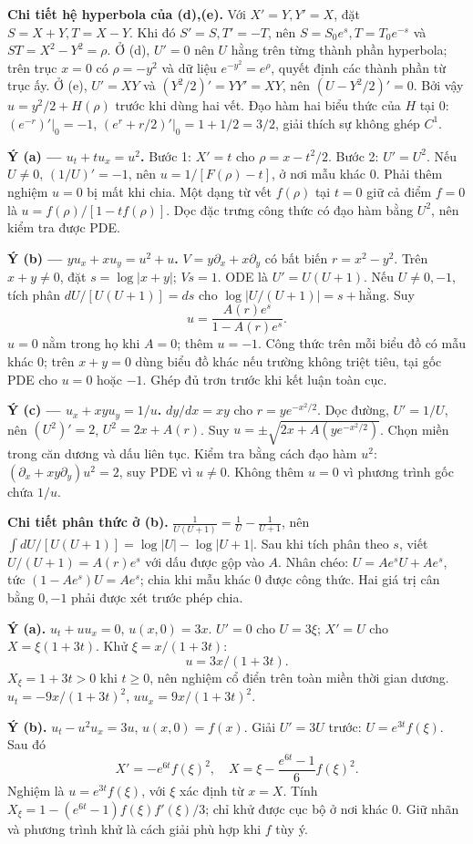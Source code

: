 \textbf{Chi tiết hệ hyperbola của (d),(e).} Với $X'=Y,Y'=X$, đặt $S=X+Y,T=X-Y$. Khi đó $S'=S,T'=-T$, nên $S=S_0e^s,T=T_0e^{-s}$ và $ST=X^2-Y^2=\rho$. Ở (d), $U'=0$ nên $U$ hằng trên từng thành phần hyperbola; trên trục $x=0$ có $\rho=-y^2$ và dữ liệu $e^{-y^2}=e^\rho$, quyết định các thành phần từ trục ấy. Ở (e), $U'=XY$ và $(Y^2/2)'=YY'=XY$, nên $(U-Y^2/2)'=0$. Bởi vậy $u=y^2/2+H(\rho)$ trước khi dùng hai vết. Đạo hàm hai biểu thức của $H$ tại $0$: $(e^{-r})'|_0=-1$, $(e^r+r/2)'|_0=1+1/2=3/2$, giải thích sự không ghép $C^1$.

\textbf{Ý (a) — $u_t+tu_x=u^2$.} Bước 1: $X'=t$ cho $\rho=x-t^2/2$. Bước 2: $U'=U^2$. Nếu $U\ne0$, $(1/U)'=-1$, nên $u=1/[F(\rho)-t]$, ở nơi mẫu khác 0. Phải thêm nghiệm $u=0$ bị mất khi chia. Một dạng từ vết $f(\rho)$ tại $t=0$ giữ cả điểm $f=0$ là $u=f(\rho)/[1-tf(\rho)]$. Dọc đặc trưng công thức có đạo hàm bằng $U^2$, nên kiểm tra được PDE.

\textbf{Ý (b) — $yu_x+xu_y=u^2+u$.} $V=y\partial_x+x\partial_y$ có bất biến $r=x^2-y^2$. Trên $x+y\ne0$, đặt $s=\log|x+y|$; $Vs=1$. ODE là $U'=U(U+1)$. Nếu $U\ne0,-1$, tích phân $dU/[U(U+1)]=ds$ cho $\log|U/(U+1)|=s+\text{hằng}$. Suy
\[u=\frac{A(r)e^s}{1-A(r)e^s}.\]
$u=0$ nằm trong họ khi $A=0$; thêm $u=-1$. Công thức trên mỗi biểu đồ có mẫu khác 0; trên $x+y=0$ dùng biểu đồ khác nếu trường không triệt tiêu, tại gốc PDE cho $u=0$ hoặc $-1$. Ghép đủ trơn trước khi kết luận toàn cục.

\textbf{Ý (c) — $u_x+xyu_y=1/u$.} $dy/dx=xy$ cho $r=ye^{-x^2/2}$. Dọc đường, $U'=1/U$, nên $(U^2)'=2$, $U^2=2x+A(r)$. Suy $u=\pm\sqrt{2x+A(ye^{-x^2/2})}$. Chọn miền trong căn dương và dấu liên tục. Kiểm tra bằng cách đạo hàm $u^2$: $(\partial_x+xy\partial_y)u^2=2$, suy PDE vì $u\ne0$. Không thêm $u=0$ vì phương trình gốc chứa $1/u$.

\textbf{Chi tiết phân thức ở (b).} $\frac1{U(U+1)}=\frac1U-\frac1{U+1}$, nên $\int dU/[U(U+1)]=\log|U|-\log|U+1|$. Sau khi tích phân theo $s$, viết $U/(U+1)=A(r)e^s$ với dấu được gộp vào $A$. Nhân chéo: $U=Ae^sU+Ae^s$, tức $(1-Ae^s)U=Ae^s$; chia khi mẫu khác $0$ được công thức. Hai giá trị cân bằng $0,-1$ phải được xét trước phép chia.

\textbf{Ý (a).} $u_t+uu_x=0$, $u(x,0)=3x$. $U'=0$ cho $U=3\xi$; $X'=U$ cho $X=\xi(1+3t)$. Khử $\xi=x/(1+3t)$:
\[u=3x/(1+3t).\]
$X_\xi=1+3t>0$ khi $t\ge0$, nên nghiệm cổ điển trên toàn miền thời gian dương. $u_t=-9x/(1+3t)^2$, $uu_x=9x/(1+3t)^2$.

\textbf{Ý (b).} $u_t-u^2u_x=3u$, $u(x,0)=f(x)$. Giải $U'=3U$ trước: $U=e^{3t}f(\xi)$. Sau đó
\[X'= -e^{6t}f(\xi)^2,\quad X=\xi-\frac{e^{6t}-1}{6}f(\xi)^2.\]
Nghiệm là $u=e^{3t}f(\xi)$, với $\xi$ xác định từ $x=X$. Tính $X_\xi=1-(e^{6t}-1)f(\xi)f'(\xi)/3$; chỉ khử được cục bộ ở nơi khác 0. Giữ nhãn và phương trình khử là cách giải phù hợp khi $f$ tùy ý.

